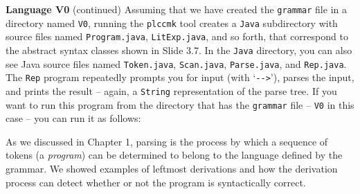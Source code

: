 \begin{minipage}[t]{\sw}
\slidenumber
\LARGE
{\bf Language V0} (continued)\exx
Assuming that we have created the \verb'grammar' file
in a directory named \verb'V0',
running the \verb'plccmk' tool creates a \verb'Java' subdirectory
with source files named \verb'Program.java',
\verb'LitExp.java', and so forth,
that correspond to the abstract syntax classes shown in Slide 3.7.
In the \verb'Java' directory,
you can also see Java source files named \verb'Token.java',
\verb'Scan.java',
\verb'Parse.java',
and \verb'Rep.java'.\exx
The \verb'Rep' program
repeatedly prompts you for input (with `\verb'-->''),
parses the input,
and prints the result --
again, a \verb'String' representation of the parse tree.
If you want to run this program
from the directory that has the \verb'grammar' file --
\verb'V0' in this case --
you can run it as follows:
{\Large
{}
}
As we discussed in Chapter 1,
parsing is the process by which a sequence of tokens
(a {\em program}) can be determined
to belong to the language defined by the grammar.
We showed examples of leftmost derivations
and how the derivation process can detect whether or not
the program is syntactically correct.

\end{minipage}
\clearpage
